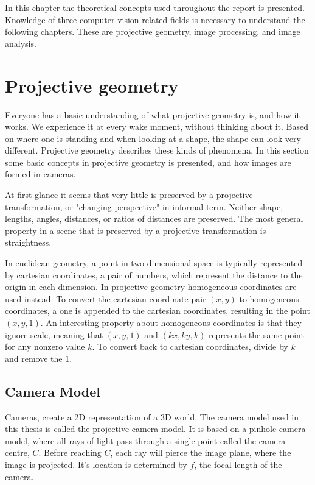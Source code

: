 In this chapter the theoretical concepts used throughout the report is presented. Knowledge of three computer vision related fields is necessary to understand the following chapters. These are projective geometry, image processing, and image analysis.

\section{Projective geometry}
Everyone has a basic understanding of what projective geometry is, and how it works.
We experience it at every wake moment, without thinking about it. 
Based on where one is standing and when looking at a shape, the shape can look very different. %
Projective geometry describes these kinds of phenomena.
In this section some basic concepts in projective geometry is presented, and how images are formed in cameras.

At first glance it seems that very little is preserved by a projective transformation, or "changing perspective" in informal term.
Neither shape, lengths, angles, distances, or ratios of distances are preserved.
The most general property in a scene that is preserved by a projective transformation is straightness. \cite[1]{hartley-zisserman}

In euclidean geometry, a point in two-dimensional space is typically represented by cartesian coordinates, a pair of numbers, which represent the distance to the origin in each dimension. %
In projective geometry homogeneous coordinates are used instead.
To convert the cartesian coordinate pair $(x,y)$ to homogeneous coordinates, a one is appended to the cartesian coordinates, resulting in the point $(x,y,1)$. 
An interesting property about homogeneous coordinates is that they ignore scale, meaning that $(x,y,1)$ and $(kx,ky,k)$ represents the same point for any nonzero value $k$.
To convert back to cartesian coordinates, divide by $k$ and remove the $1$.\cite[2]{hartley-zisserman} %

\subsection{Camera Model}\label{camera-model}
Cameras, create a 2D representation of a 3D world.
The camera model used in this thesis is called the projective camera model.
It is based on a pinhole camera model, where all rays of light pass through a single point called the camera centre, $C$. Before reaching $C$, each ray will pierce the image plane, where the image is projected.
It's location is determined by $f$, the focal length of the camera.

